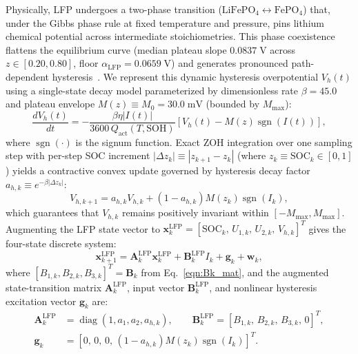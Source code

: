 \documentclass[10pt,a4paper]{article}
\begin{document}
Physically, LFP undergoes a two-phase transition ($\text{LiFePO}_4 \leftrightarrow \text{FePO}_4$) that, under the Gibbs phase rule at fixed temperature and pressure, pins lithium chemical potential across intermediate stoichiometries. This phase coexistence flattens the equilibrium curve (median plateau slope $0.0837\;\mathrm{V}$ across $z\in[0.20,0.80]$, floor $\alpha_{\text{LFP}} = 0.0659\;\mathrm{V}$) and generates pronounced path-dependent hysteresis~\cite{Roscher2011hysteresis,Verbrugge2004hysteresis}. We represent this dynamic hysteresis overpotential $V_h(t)$ using a single-state decay model parameterized by dimensionless rate $\beta = 45.0$ and plateau envelope $M(z) \equiv M_0 = 30.0\;\mathrm{mV}$ (bounded by $M_{\max}$):
\begin{equation}\label{eqn:hysteresis_diff}
\frac{d V_h(t)}{dt} = -\frac{\beta \eta |I(t)|}{3600\,Q_{\text{act}}(T, \text{SOH})} \left[ V_h(t) - M(z) \operatorname{sgn}(I(t)) \right],
\end{equation}
where $\operatorname{sgn}(\cdot)$ is the signum function. Exact ZOH integration over one sampling step with per-step SOC increment $|\Delta z_k| \equiv |z_{k+1} - z_k|$ (where $z_k \equiv \text{SOC}_k \in [0, 1]$) yields a contractive convex update governed by hysteresis decay factor $a_{h,k} \equiv e^{-\beta |\Delta z_k|}$:
\begin{equation}\label{eqn:hysteresis_discrete}
V_{h,k+1} = a_{h,k} V_{h,k} + \left(1 - a_{h,k}\right) M(z_k) \operatorname{sgn}(I_k),
\end{equation}
which guarantees that $V_{h,k}$ remains positively invariant within $[-M_{\max}, M_{\max}]$. Augmenting the LFP state vector to $\mathbf{x}_k^{\text{LFP}} = [\text{SOC}_k,\, U_{1,k},\, U_{2,k},\, V_{h,k}]^T$ gives the four-state discrete system:
\begin{equation}\label{eqn:x_lfp}
\mathbf{x}_{k+1}^{\text{LFP}} = \mathbf{A}_k^{\text{LFP}} \mathbf{x}_k^{\text{LFP}} + \mathbf{B}_k^{\text{LFP}} I_k + \mathbf{g}_k + \mathbf{w}_k,
\end{equation}
where $[B_{1,k}, B_{2,k}, B_{3,k}]^T = \mathbf{B}_k$ from Eq.~\eqref{eqn:Bk_mat}, and the augmented state-transition matrix $\mathbf{A}_k^{\text{LFP}}$, input vector $\mathbf{B}_k^{\text{LFP}}$, and nonlinear hysteresis excitation vector $\mathbf{g}_k$ are:
\begin{align*}
\mathbf{A}_k^{\text{LFP}} &= \operatorname{diag}(1, a_1, a_2, a_{h,k}), \qquad
\mathbf{B}_k^{\text{LFP}} = [B_{1,k},\, B_{2,k},\, B_{3,k},\, 0]^T, \\
\mathbf{g}_k &= \left[0,\, 0,\, 0,\, (1 - a_{h,k}) M(z_k) \operatorname{sgn}(I_k)\right]^T.
\end{align*}
\end{document}
